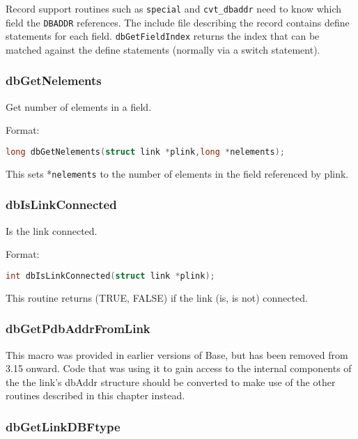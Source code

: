 Record support routines such as \verb|special| and \verb|cvt_dbaddr| need to know which field the \verb|DBADDR| references.
The include file describing the record contains define statements for each field.
\verb|dbGetFieldIndex| returns the index that can be matched against the define statements (normally via a switch statement).

\subsubsection{dbGetNelements}

Get number of elements in a field.

Format:

\begin{lstlisting}[language=C]
 long dbGetNelements(struct link *plink,long *nelements);
\end{lstlisting}

This sets *\verb|nelements| to the number of elements in the field referenced by plink.

\subsubsection{dbIsLinkConnected}

Is the link connected.

Format:

\begin{lstlisting}[language=C]
int dbIsLinkConnected(struct link *plink);
\end{lstlisting}

This routine returns (TRUE, FALSE) if the link (is, is not) connected.

\subsubsection{dbGetPdbAddrFromLink}

This macro was provided in earlier versions of Base, but has been removed from 3.15 onward.
Code that was using it to gain access to the internal components of the the link's dbAddr structure should be converted to make use of the other routines described in this chapter instead.

\subsubsection{dbGetLinkDBFtype}


